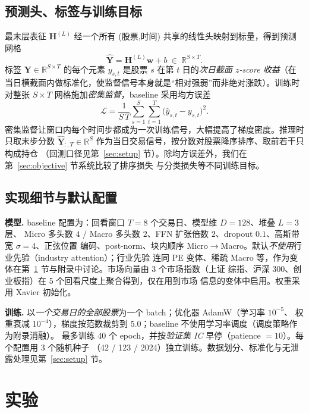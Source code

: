 \documentclass[a4paper,11pt,fontset=fandol]{ctexart}
\begin{document}
\subsection{预测头、标签与训练目标}\label{sec:m-head}
最末层表征 $\bm{H}^{(L)}$ 经一个所有 (股票,时间) 共享的线性头映射到标量，得到预测网格
\begin{equation}\label{eq:head}
\hat{\bm{Y}} = \bm{H}^{(L)}\bm{w} + b\ \in\ \mathbb{R}^{S\times T}.
\end{equation}
标签 $\bm{Y}\in\mathbb{R}^{S\times T}$ 的每个元素 $y_{s,t}$ 是股票 $s$ 在第 $t$ 日的\emph{次日截面
$z$-score 收益}（在当日横截面内做标准化，使监督信号本身就是“相对强弱”而非绝对涨跌）。训练时对整张
$S\times T$ 网格施加\emph{密集监督}，baseline 采用均方误差
\begin{equation}\label{eq:loss}
\mathcal{L}=\frac{1}{S\,T}\sum_{s=1}^{S}\sum_{t=1}^{T}\big(\hat{y}_{s,t}-y_{s,t}\big)^2 .
\end{equation}
密集监督让窗口内每个时间步都成为一次训练信号，大幅提高了梯度密度。推理时只取末步分数
$\hat{\bm{Y}}_{:,T}\in\mathbb{R}^{S}$ 作为当日交易信号，按分数对股票降序排序、取前若干只构成持仓
（回测口径见第~\ref{sec:setup} 节）。除均方误差外，我们在第~\ref{sec:objective} 节系统比较了排序损失
与分类损失等不同训练目标。

\subsection{实现细节与默认配置}\label{sec:m-impl}
\textbf{\heiti 模型.} baseline 配置为：回看窗口 $T{=}8$ 个交易日、模型维 $D{=}128$、堆叠 $L{=}3$ 层、
Micro 多头数 $4$ / Macro 多头数 $2$、FFN 扩张倍数 $2$、dropout $0.1$、高斯带宽 $\sigma{=}4$、正弦位置
编码、post-norm、块内顺序 Micro$\to$Macro。默认\emph{不使用}行业先验（industry attention）；行业先验
连同 PE 变体、稀疏 Macro 等，作为变体在第~\ref{sec:exp} 节与附录中讨论。市场向量由 3 个市场指数（上证
综指、沪深 300、创业板指）在 5 个回看尺度上聚合得到，仅在用到市场
信息的变体中启用。权重采用 Xavier 初始化。

\textbf{\heiti 训练.} 以\emph{一个交易日的全部股票}为一个 batch；优化器 AdamW（学习率 $10^{-5}$、
权重衰减 $10^{-4}$），梯度按范数裁剪到 $5.0$；baseline 不使用学习率调度（调度策略作为附录消融）。
最多训练 $40$ 个 epoch，并按\emph{验证集 IC} 早停（patience $=10$）。每个配置用 3 个随机种子
（42 / 123 / 2024）独立训练。数据划分、标准化与无泄露处理见第~\ref{sec:setup} 节。

\section{实验}\label{sec:exp}
\end{document}
